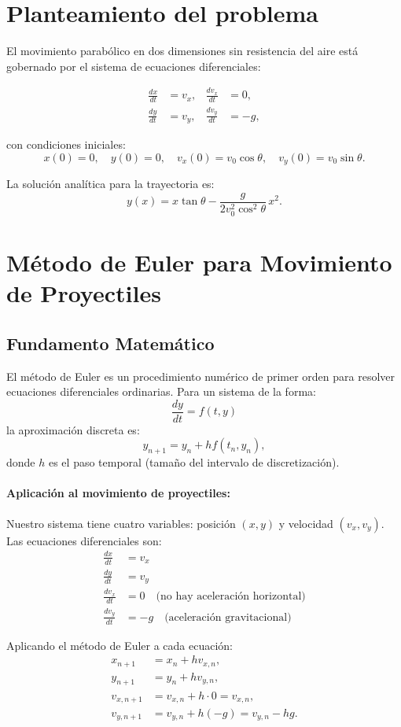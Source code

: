 \documentclass[12pt,a4paper]{article}
\begin{document}
\section*{Planteamiento del problema}

El movimiento parabólico en dos dimensiones sin resistencia del aire está gobernado por el sistema de ecuaciones diferenciales:

\begin{align*}
\frac{dx}{dt} &= v_x, & \frac{dv_x}{dt} &= 0, \\
\frac{dy}{dt} &= v_y, & \frac{dv_y}{dt} &= -g,
\end{align*}

con condiciones iniciales:
\[
x(0)=0, \quad y(0)=0, \quad v_x(0)=v_0\cos\theta, \quad v_y(0)=v_0\sin\theta.
\]

La solución analítica para la trayectoria es:
\[
y(x) = x \tan\theta - \frac{g}{2 v_0^2 \cos^2\theta} \, x^2.
\]
\section*{Método de Euler para Movimiento de Proyectiles}

\subsection*{Fundamento Matemático}

El método de Euler es un procedimiento numérico de primer orden para resolver ecuaciones diferenciales ordinarias. Para un sistema de la forma:
\[
\frac{dy}{dt} = f(t, y)
\]
la aproximación discreta es:
\[
y_{n+1} = y_n + h f(t_n, y_n),
\]
donde $h$ es el paso temporal (tamaño del intervalo de discretización).

\paragraph{Aplicación al movimiento de proyectiles:} Nuestro sistema tiene cuatro variables: posición $(x, y)$ y velocidad $(v_x, v_y)$. Las ecuaciones diferenciales son:
\begin{align*}
\frac{dx}{dt} &= v_x \\
\frac{dy}{dt} &= v_y \\
\frac{dv_x}{dt} &= 0 \quad \text{(no hay aceleración horizontal)} \\
\frac{dv_y}{dt} &= -g \quad \text{(aceleración gravitacional)}
\end{align*}

Aplicando el método de Euler a cada ecuación:
\begin{align*}
x_{n+1} &= x_n + h v_{x,n}, \\
y_{n+1} &= y_n + h v_{y,n}, \\
v_{x,n+1} &= v_{x,n} + h \cdot 0 = v_{x,n}, \\
v_{y,n+1} &= v_{y,n} + h (-g) = v_{y,n} - h g.
\end{align*}
\end{document}
